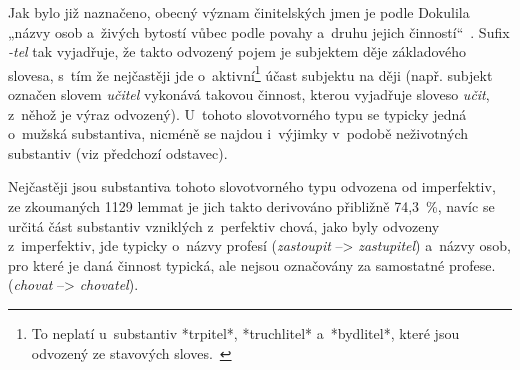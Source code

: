 Jak bylo již naznačeno, obecný význam činitelských jmen je podle
Dokulila „názvy osob a~živých bytostí vůbec podle povahy a~druhu jejich
činností``~\parencite[17]{dokulil67}. Sufix \emph{-tel} tak vyjadřuje,
že takto odvozený pojem je subjektem děje základového slovesa, s~tím že
nejčastěji jde
o~aktivní\footnote{To neplatí u~substantiv *trpitel*, *truchlitel* a~*bydlitel*, které jsou odvozený ze stavových sloves.~\parencite[17]{dokulil67}}
účast subjektu na ději (např. subjekt označen slovem \emph{učitel}
vykonává takovou činnost, kterou vyjadřuje sloveso \emph{učit}, z~něhož
je výraz odvozený). U~tohoto slovotvorného typu se typicky jedná
o~mužská substantiva, nicméně se najdou i~výjimky v~podobě neživotných
substantiv (viz předchozí odstavec).~\parencite{simandl2016}

Nejčastěji jsou substantiva tohoto slovotvorného typu odvozena od
imperfektiv, ze zkoumaných 1129 lemmat je jich takto derivováno
přibližně 74,3~\%, navíc se určitá část substantiv vzniklých z~perfektiv
chová, jako byly odvozeny z~imperfektiv, jde typicky o~názvy profesí
(\emph{zastoupit} --\textgreater{} \emph{zastupitel}) a~názvy osob, pro
které je daná činnost typická, ale nejsou označovány za samostatné
profese. (\emph{chovat} --\textgreater{} \emph{chovatel}).
